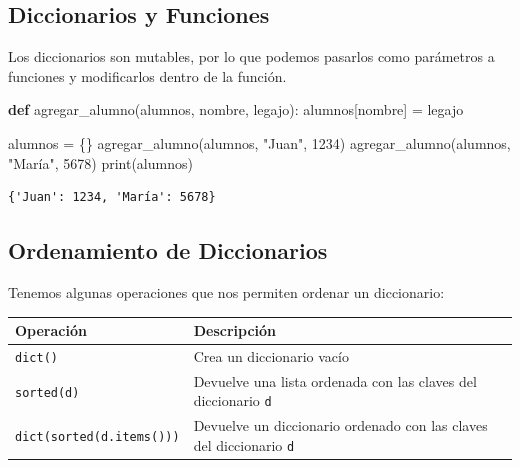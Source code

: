 \documentclass[
  letterpaper,
  DIV=11,
  numbers=noendperiod]{scrreprt}
\newenvironment{Shaded}{\begin{snugshade}}{\end{snugshade}}
\newcommand{\BuiltInTok}[1]{\textcolor[rgb]{0.00,0.23,0.31}{#1}}
\newcommand{\DecValTok}[1]{\textcolor[rgb]{0.68,0.00,0.00}{#1}}
\newcommand{\KeywordTok}[1]{\textcolor[rgb]{0.00,0.23,0.31}{\textbf{#1}}}
\newcommand{\NormalTok}[1]{\textcolor[rgb]{0.00,0.23,0.31}{#1}}
\newcommand{\OperatorTok}[1]{\textcolor[rgb]{0.37,0.37,0.37}{#1}}
\newcommand{\StringTok}[1]{\textcolor[rgb]{0.13,0.47,0.30}{#1}}
\begin{document}
\subsection{Diccionarios y Funciones}\label{diccionarios-y-funciones}

Los diccionarios son mutables, por lo que podemos pasarlos como
parámetros a funciones y modificarlos dentro de la función.

\begin{Shaded}
\begin{Highlighting}[]
\KeywordTok{def}\NormalTok{ agregar\_alumno(alumnos, nombre, legajo):}
\NormalTok{  alumnos[nombre] }\OperatorTok{=}\NormalTok{ legajo}

\NormalTok{alumnos }\OperatorTok{=}\NormalTok{ \{\}}
\NormalTok{agregar\_alumno(alumnos, }\StringTok{"Juan"}\NormalTok{, }\DecValTok{1234}\NormalTok{)}
\NormalTok{agregar\_alumno(alumnos, }\StringTok{"María"}\NormalTok{, }\DecValTok{5678}\NormalTok{)}
\BuiltInTok{print}\NormalTok{(alumnos)}
\end{Highlighting}
\end{Shaded}

\begin{verbatim}
{'Juan': 1234, 'María': 5678}
\end{verbatim}

\subsection{Ordenamiento de
Diccionarios}\label{ordenamiento-de-diccionarios}

Tenemos algunas operaciones que nos permiten ordenar un diccionario:

\begin{longtable}[]{@{}
  >{\raggedright\arraybackslash}p{}
  >{\raggedright\arraybackslash}p{}@{}}
\toprule\noalign{}
\begin{minipage}[b]{\linewidth}\raggedright
Operación
\end{minipage} & \begin{minipage}[b]{\linewidth}\raggedright
Descripción
\end{minipage} \\
\midrule\noalign{}
\endhead
\bottomrule\noalign{}
\endlastfoot
\texttt{dict()} & Crea un diccionario vacío \\
\texttt{sorted(d)} & Devuelve una lista ordenada con las claves del
diccionario \texttt{d} \\
\texttt{dict(sorted(d.items()))} & Devuelve un diccionario ordenado con
las claves del diccionario \texttt{d} \\
\end{longtable}
\end{document}
